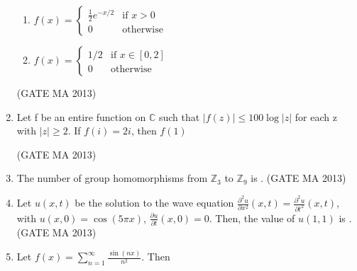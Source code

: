 \documentclass[journal,12pt,onecolumn]{IEEEtran}
\theoremstyle{remark}
\begin{document}
\begin{enumerate}
\begin{enumerate}
        \item $f(x) = \begin{cases} \frac{1}{2}e^{-x/2} & \text{if } x>0 \\ 0 & \text{otherwise} \end{cases}$
        \item $f(x) = \begin{cases} 1/2 & \text{if } x \in [0,2] \\ 0 & \text{otherwise} \end{cases}$
    \end{enumerate}
    \hfill (GATE MA 2013)
    \item Let f be an entire function on $\mathbb{C}$ such that $|f(z)| \le 100 \log|z|$ for each z with $|z| \ge 2$. If $f(i) = 2i$, then $f(1)$
    \begin{enumerate}
    \end{enumerate}
    \hfill (GATE MA 2013)
    \item The number of group homomorphisms from $\mathbb{Z}_3$ to $\mathbb{Z}_9$ is \underline{\hspace{1cm}}.
    \hfill (GATE MA 2013)
    \item Let $u(x,t)$ be the solution to the wave equation $\frac{\partial^2 u}{\partial x^2}(x,t) = \frac{\partial^2 u}{\partial t^2}(x,t)$, with $u(x,0) = \cos(5\pi x)$, $\frac{\partial u}{\partial t}(x,0) = 0$. Then, the value of $u(1,1)$ is \underline{\hspace{1cm}}.
    \hfill (GATE MA 2013)
    \item Let $f(x) = \sum_{n=1}^{\infty} \frac{\sin(nx)}{n^2}$. Then
    \begin{enumerate}

\end{enumerate}
\end{enumerate}
\end{document}
